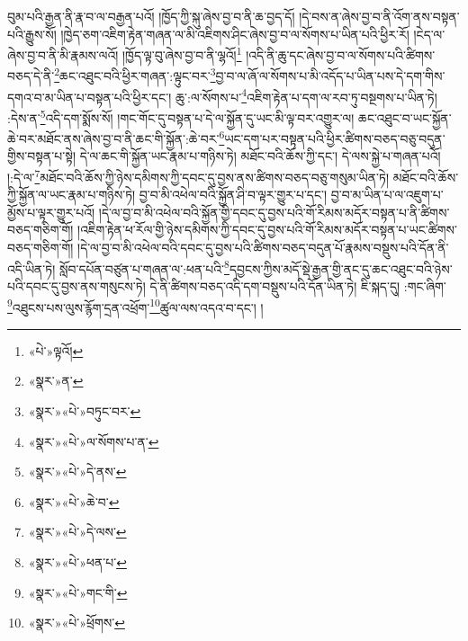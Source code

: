 བུམ་པའི་རྒྱན་ནི་རྣ་བ་ལ་བརྒྱན་པའོ། །ཁྱོད་ཀྱི་སྐུ་ཞེས་བྱ་བ་ནི་ཆ་བྱད་དོ། །དེ་བས་ན་ཞེས་བྱ་བ་ནི་འོག་ནས་བསྟན་པའི་རྒྱུས་སོ། །ཁྱེད་ཅག་འཇིག་རྟེན་གཞན་ལ་མི་འཇིགས་ཤིང་ཞེས་བྱ་བ་ལ་སོགས་པ་ཡིན་པའི་ཕྱིར་རོ། །ངེད་ལ་ཞེས་བྱ་བ་ནི་མི་རྣམས་ལའོ། །ཁྱོད་ལྟ་བུ་ཞེས་བྱ་བ་ནི་ལྷའོ།\footnote{«པེ་»ལྟའོ།} །འདི་ནི་ཆུ་དང་ཞེས་བྱ་བ་ལ་སོགས་པའི་ཚིགས་བཅད་དེ་ནི་\footnote{«སྣར་»ན་}ཆང་འཐུང་བའི་ཕྱིར་གཞན་:ལྟུང་བར་\footnote{«སྣར་»«པེ་»བཏུང་བར་}བྱ་བ་ལ་ཞོ་ལ་སོགས་པ་མི་འདོད་པ་ཡིན་པས་དེ་དག་གིས་དགའ་བ་མ་ཡིན་པ་བསྟན་པའི་ཕྱིར་དང་། ཆུ་:ལ་སོགས་པ་\footnote{«སྣར་»«པེ་»ལ་སོགས་པ་ན་}འཇིག་རྟེན་པ་དག་ལ་རབ་ཏུ་བསྔགས་པ་ཡིན་ཏེ། :དེས་ན་\footnote{«སྣར་»«པེ་»དེ་ནས་}འདི་དག་སྨོས་སོ། །གང་གོང་དུ་བསྟན་པ་དེ་ལ་སྐྱོན་དུ་ཡང་མི་ལྟ་བར་འགྱུར་ལ། ཆང་འཐུང་བ་ཡང་སྐྱོན་ཆེ་བར་མཐོང་ནས་ཞེས་བྱ་བ་ནི་ཆང་གི་སྐྱོན་:ཆེ་བར་\footnote{«སྣར་»«པེ་»ཆེ་བ་}ཡང་དག་པར་བསྟན་པའི་ཕྱིར་ཚིགས་བཅད་བཅུ་བདུན་གྱིས་བསྟན་པ་སྟེ། དེ་ལ་ཆང་གི་སྐྱོན་ཡང་རྣམ་པ་གཉིས་ཏེ། མཐོང་བའི་ཆོས་ཀྱི་དང་། དེ་ལས་སྐྱེ་པ་གཞན་པའོ། །:དེ་ལ་\footnote{«སྣར་»«པེ་»དེ་ལས་}མཐོང་བའི་ཆོས་ཀྱི་ཉེས་དམིགས་ཀྱི་དབང་དུ་བྱས་ནས་ཚིགས་བཅད་བཅུ་གསུམ་ཡིན་ཏེ། མཐོང་བའི་ཆོས་ཀྱི་སྐྱོན་ལ་ཡང་རྣམ་པ་གཉིས་ཏེ། བྱ་བ་མི་འཕེལ་བའི་སྐྱོན་ཤི་བ་ལྟར་གྱུར་པ་དང་། བྱ་བ་མ་ཡིན་པ་ལ་འཇུག་པ་མྱོས་པ་ལྟར་གྱུར་པའོ། །དེ་ལ་བྱ་བ་མི་འཕེལ་བའི་སྐྱོན་གྱི་དབང་དུ་བྱས་པའི་གོ་རིམས་མདོར་བསྟན་པ་ནི་ཚིགས་བཅད་གཅིག་གོ། །འཇིག་རྟེན་ཕ་རོལ་གྱི་ཉེས་དམིགས་ཀྱི་དབང་དུ་བྱས་པའི་གོ་རིམས་མདོར་བསྟན་པ་ཡང་ཚིགས་བཅད་གཅིག་གོ། །དེ་ལ་བྱ་བ་མི་འཕེལ་བའི་དབང་དུ་བྱས་པའི་ཚིགས་བཅད་བདུན་པོ་རྣམས་བསྡུས་པའི་དོན་ནི་འདི་ཡིན་ཏེ། སློབ་དཔོན་བཙུན་པ་གཞན་ལ་:ཕན་པའི་\footnote{«སྣར་»«པེ་»ཕན་པ་}དབྱངས་ཀྱིས་མདོ་སྡེ་རྒྱན་གྱི་ནང་དུ་ཆང་འཐུང་བའི་ཉེས་པའི་དབང་དུ་བྱས་ནས་གསུངས་ཏེ། དེ་ནི་ཚིགས་བཅད་འདི་དག་བསྡུས་པའི་དོན་ཡིན་ཏེ། ཇི་སྐད་དུ། :གང་ཞིག་\footnote{«སྣར་»«པེ་»གང་གི་}འཐུངས་པས་ལུས་རྙོག་དྲན་འཕྲོག་\footnote{«སྣར་»«པེ་»ཕྲོགས་}ཚུལ་ལས་འདའ་བ་དང་། །
